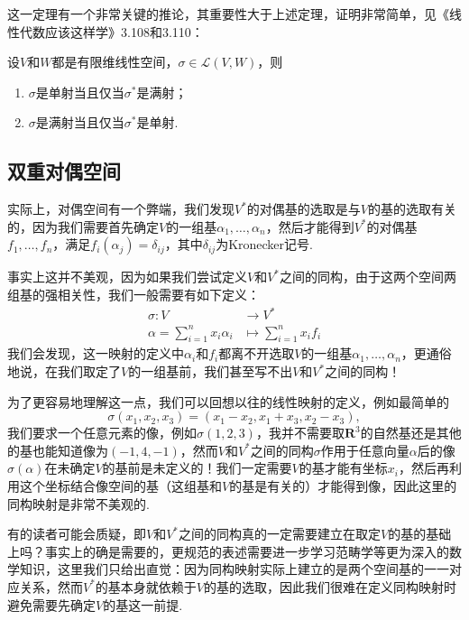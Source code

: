 \begin{enumerate}
          这一定理有一个非常关键的推论，其重要性大于上述定理，证明非常简单，见《线性代数应该这样学》3.108和3.110：
          \begin{corollary}\label{cor:9:对偶映射单满射}
              设$V$和$W$都是有限维线性空间，$\sigma\in\mathcal{L}(V,W)$，则
              \begin{enumerate}
                  \item $\sigma$是单射当且仅当$\sigma^*$是满射；

                  \item $\sigma$是满射当且仅当$\sigma^*$是单射.
              \end{enumerate}
          \end{corollary}
\end{enumerate}

\subsection{双重对偶空间}

实际上，对偶空间有一个弊端，我们发现$V^*$的对偶基的选取是与$V$的基的选取有关的，因为我们需要首先确定$V$的一组基$\alpha_1,\ldots,\alpha_n$，然后才能得到$V^*$的对偶基$f_1,\ldots,f_n$，满足$f_i(\alpha_j)=\delta_{ij}$，其中$\delta_{ij}$为Kronecker记号.

事实上这并不美观，因为如果我们尝试定义$V$和$V^*$之间的同构，由于这两个空间两组基的强相关性，我们一般需要有如下定义：
\begin{align*}
    \sigma:V                       & \to V^*                   \\
    \alpha=\sum_{i=1}^nx_i\alpha_i & \mapsto\sum_{i=1}^nx_if_i
\end{align*}
我们会发现，这一映射的定义中$\alpha_i$和$f_i$都离不开选取$V$的一组基$\alpha_1,\ldots,\alpha_n$，更通俗地说，在我们取定了$V$的一组基前，我们甚至写不出$V$和$V^*$之间的同构！

为了更容易地理解这一点，我们可以回想以往的线性映射的定义，例如最简单的
\[\sigma(x_1,x_2,x_3)=(x_1-x_2,x_1+x_3,x_2-x_3),\]
我们要求一个任意元素的像，例如$\sigma(1,2,3)$，我并不需要取$\mathbf{R}^3$的自然基还是其他的基也能知道像为$(-1,4,-1)$，然而$V$和$V^*$之间的同构$\sigma$作用于任意向量$\alpha$后的像$\sigma(\alpha)$在未确定$V$的基前是未定义的！我们一定需要$V$的基才能有坐标$x_i$，然后再利用这个坐标结合像空间的基（这组基和$V$的基是有关的）才能得到像，因此这里的同构映射是非常不美观的.

有的读者可能会质疑，即$V$和$V^*$之间的同构真的一定需要建立在取定$V$的基的基础上吗？事实上的确是需要的，更规范的表述需要进一步学习范畴学等更为深入的数学知识，这里我们只给出直觉：因为同构映射实际上建立的是两个空间基的一一对应关系，然而$V^*$的基本身就依赖于$V$的基的选取，因此我们很难在定义同构映射时避免需要先确定$V$的基这一前提.

